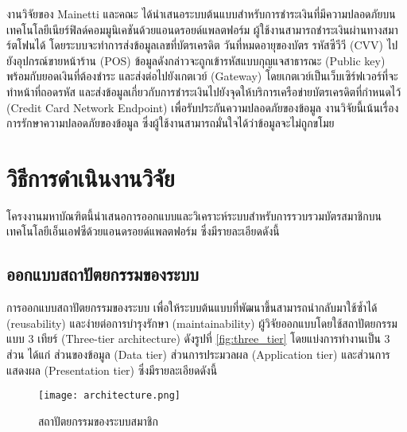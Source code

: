 \documentclass[12pt,a4paper,twocolumn]{article}
\begin{document}
งานวิจัยของ Mainetti และคณะ \cite{itm:IDA-Pay} ได้นำเสนอระบบต้นแบบสำหรับการชำระเงินที่มีความปลอดภัยบนเทคโนโลยีเนียร์ฟิลด์คอมมูนิเคชันด้วยแอนดรอยด์แพลตฟอร์ม ผู้ใช้งานสามารถชำระเงินผ่านทางสมาร์ตโฟนได้ โดยระบบจะทำการส่งข้อมูลเลขที่บัตรเครดิต วันที่หมดอายุของบัตร รหัสซีวีวี (CVV) ไปยังอุปกรณ์ขายหน้าร้าน (POS) ข้อมูลดังกล่าวจะถูกเข้ารหัสแบบกุญแจสาธารณะ (Public key) พร้อมกับยอดเงินที่ต้องชำระ และส่งต่อไปยังเกตเวย์ (Gateway) โดยเกตเวย์เป็นเว็บเซิร์ฟเวอร์ที่จะทำหน้าที่ถอดรหัส และส่งข้อมูลเกี่ยวกับการชำระเงินไปยังจุดให้บริการเครือข่ายบัตรเครดิตที่กำหนดไว้ (Credit Card Network Endpoint) เพื่อรับประกันความปลอดภัยของข้อมูล งานวิจัยนี้เน้นเรื่องการรักษาความปลอดภัยของข้อมูล ซึ่งผู้ใช้งานสามารถมั่นใจได้ว่าข้อมูลจะไม่ถูกขโมย


\section{วิธีการดำเนินงานวิจัย}
โครงงานมหาบัณฑิตนี้นําเสนอการออกแบบและวิเคราะห์ระบบสำหรับการรวบรวมบัตรสมาชิกบนเทคโนโลยีเอ็นเอฟซีด้วยแอนดรอยด์แพลตฟอร์ม ซึ่งมีรายละเอียดดังนี้

\subsection{ออกแบบสถาปัตยกรรมของระบบ}
การออกแบบสถาปัตยกรรมของระบบ เพื่อให้ระบบต้นแบบที่พัฒนาขึ้นสามารถนำกลับมาใช้ซ้ำได้ (reusability) และง่ายต่อการบำรุงรักษา (maintainability) ผู้วิจัยออกแบบโดยใช้สถาปัตยกรรมแบบ 3 เทียร์ (Three-tier architecture) ดังรูปที่ \ref{fig:three_tier} โดยแบ่งการทำงานเป็น 3 ส่วน ได้แก่ ส่วนของข้อมูล (Data tier) ส่วนการประมวลผล (Application tier) และส่วนการแสดงผล (Presentation tier) ซึ่งมีรายละเอียดดังนี้

\begin{figure}[ht!]
\centering
\texttt{[image: architecture.png]}
\caption{สถาปัตยกรรมของระบบสมาชิก} \label{fig:three_tier}
\label{overflow}
\end{figure}
\end{document}
